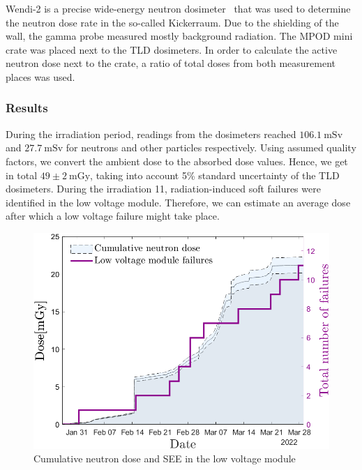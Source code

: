 Wendi-2 is a precise wide-energy neutron dosimeter~\cite{wendi} that was used to determine the neutron dose rate in the so-called Kickerraum. Due to the shielding of the wall, the gamma probe measured mostly background radiation. The MPOD mini crate was placed next to the TLD dosimeters. In order to calculate the active neutron dose next to the crate, a ratio of total doses from both measurement places was used. 
\newpage
\subsubsection{Results}
During the irradiation period, readings from the dosimeters reached $106.1\mathrm{\ mSv}$ and $27.7\mathrm{\ mSv}$ for neutrons and other particles respectively.
Using assumed quality factors, we convert the ambient dose to the absorbed dose values. Hence, we get in total $49\pm{2}\mathrm{\ mGy}$, taking into account 5\% standard uncertainty of the TLD dosimeters. During the irradiation 11, radiation-induced soft failures were identified in the low voltage module. Therefore, we can estimate an average dose after which a low voltage failure might take place.
\begin{figure}[!h]
    \centering
    \includegraphics[width=0.57\columnwidth]{Chapter4/images/LV_failure_and_neutronsrate.png}
    \caption{Cumulative neutron dose and SEE in the low voltage module}
    \label{fig:lv_neutrons}
\end{figure}
